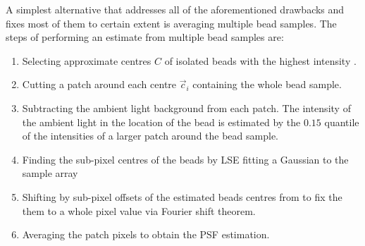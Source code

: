 A simplest alternative that addresses all of the aforementioned drawbacks and fixes most of them to certain extent is 
    averaging multiple bead samples.
The steps of performing an estimate from multiple bead samples are:
\begin{enumerate}[label=\roman*.]
    \item Selecting approximate centres \(C\) of isolated beads with the highest intensity%
        .
    \item Cutting a patch around each centre \(\vec{c}_i\) containing the whole bead sample.
    \item Subtracting the ambient light background from each patch. 
        The intensity of the ambient light in the location of the bead is estimated by the \(0.15\) quantile of the 
            intensities of a larger patch around the bead sample.
    \item Finding the sub-pixel centres of the beads by \ac{LSE} fitting a Gaussian%
        to the sample array 
    \item Shifting by sub-pixel offsets of the estimated beads centres from  to fix the them to a whole
        pixel value via Fourier shift theorem.
    \item Averaging the patch pixels to obtain the \ac{PSF} estimation.
\end{enumerate}

